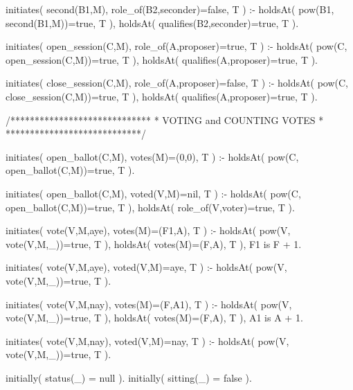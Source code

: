 \begin{prologinline}[caption=Implementation of RONR in Prolog]
initiates( second(B1,M), role_of(B2,seconder)=false, T ) :-
	holdsAt( pow(B1, second(B1,M))=true, T ),
    holdsAt( qualifies(B2,seconder)=true, T ).

initiates( open_session(C,M), role_of(A,proposer)=true, T ) :-
	holdsAt( pow(C, open_session(C,M))=true, T ),
	holdsAt( qualifies(A,proposer)=true, T ).

initiates( close_session(C,M), role_of(A,proposer)=false, T ) :-
	holdsAt( pow(C, close_session(C,M))=true, T ),
	holdsAt( qualifies(A,proposer)=true, T ).

/*****************************
 * VOTING and COUNTING VOTES *
 ****************************/


initiates( open_ballot(C,M), votes(M)=(0,0), T ) :-
	holdsAt( pow(C, open_ballot(C,M))=true, T ).

initiates( open_ballot(C,M), voted(V,M)=nil, T ) :-
    holdsAt( pow(C, open_ballot(C,M))=true, T ),
	holdsAt( role_of(V,voter)=true, T ).

initiates( vote(V,M,aye), votes(M)=(F1,A), T ) :-
	holdsAt( pow(V, vote(V,M,_))=true, T ),
	holdsAt( votes(M)=(F,A), T ),
	F1 is F + 1.

initiates( vote(V,M,aye), voted(V,M)=aye, T ) :-
	holdsAt( pow(V, vote(V,M,_))=true, T ).

initiates( vote(V,M,nay), votes(M)=(F,A1), T ) :-
	holdsAt( pow(V, vote(V,M,_))=true, T ),
	holdsAt( votes(M)=(F,A), T ),
	A1 is A + 1.

initiates( vote(V,M,nay), voted(V,M)=nay, T ) :-
	holdsAt( pow(V, vote(V,M,_))=true, T ).

initially( status(_) = null ).
initially( sitting(_) = false ).
\end{prologinline}